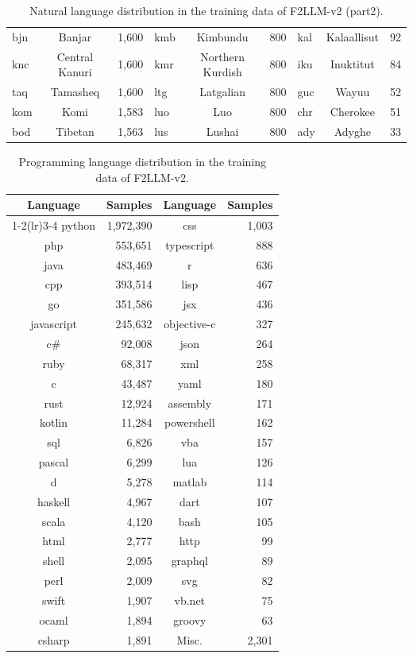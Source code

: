 \begin{table}[th]
{\begin{tabular}{m{1cm}<{\centering}cr|m{1cm}<{\centering}cr|m{1cm}<{\centering}cr}
bjn & Banjar & 1,600 & kmb & Kimbundu & 800 & kal & Kalaallisut & 92 \\
knc & Central Kanuri & 1,600 & kmr & Northern Kurdish & 800 & iku & Inuktitut & 84 \\
taq & Tamasheq & 1,600 & ltg & Latgalian & 800 & guc & Wayuu & 52 \\
kom & Komi & 1,583 & luo & Luo & 800 & chr & Cherokee & 51 \\
bod & Tibetan & 1,563 & lus & Lushai & 800 & ady & Adyghe & 33 \\
    \bottomrule
    \end{tabular}
    }
    \caption{Natural language distribution in the training data of F2LLM-v2 (part2).}
    \label{tab:language-distribution-2}
\end{table}

\begin{table}[th]
    \small
    \centering
    \begin{tabular}{cr|cr}
    \toprule
Language & Samples & Language & Samples \\
    \cmidrule(r){1-2}\cmidrule(lr){3-4}
python & 1,972,390 & css & 1,003 \\
php & 553,651 & typescript & 888 \\
java & 483,469 & r & 636 \\
cpp & 393,514 & lisp & 467 \\
go & 351,586 & jsx & 436 \\
javascript & 245,632 & objective-c & 327 \\
c\# & 92,008 & json & 264 \\
ruby & 68,317 & xml & 258 \\
c & 43,487 & yaml & 180 \\
rust & 12,924 & assembly & 171 \\
kotlin & 11,284 & powershell & 162 \\
sql & 6,826 & vba & 157 \\
pascal & 6,299 & lua & 126 \\
d & 5,278 & matlab & 114 \\
haskell & 4,967 & dart & 107 \\
scala & 4,120 & bash & 105 \\
html & 2,777 & http & 99 \\
shell & 2,095 & graphql & 89 \\
perl & 2,009 & svg & 82 \\
swift & 1,907 & vb.net & 75 \\
ocaml & 1,894 & groovy & 63 \\
csharp & 1,891 & Misc. & 2,301 \\
    \bottomrule
    \end{tabular}
    \caption{Programming language distribution in the training data of F2LLM-v2.}
    \label{tab:language-distribution-3}
\end{table}